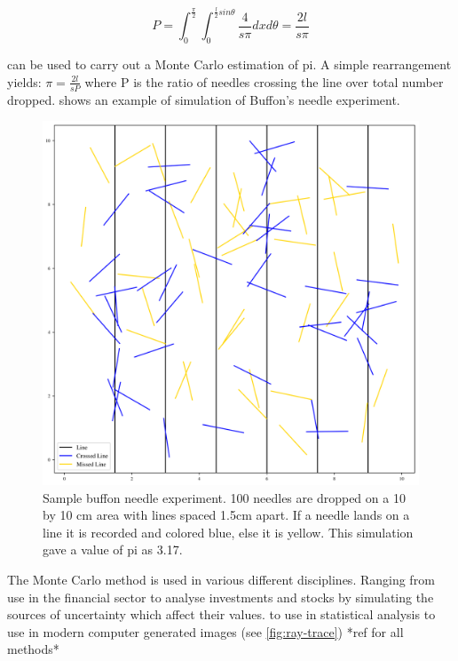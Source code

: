 \begin{equation}
P=\int_0^{\frac{\pi}{2}}\int_0^{\frac{l}{2}sin\theta}\frac{4}{s\pi}dx d\theta = \frac{2 l}{s \pi}\label{eqn:buffon}
\end{equation}


 can be used to carry out a Monte Carlo estimation of pi. A simple rearrangement yields: $\pi = \tfrac{2l}{sP}$ where P is the ratio of needles crossing the line over total number dropped.  shows an example of simulation of Buffon's needle experiment.

\begin{figure}
\centering
\includegraphics[width=\columnwidth/2]{./MCRT/images/buffon-pi=317.pdf}
\caption{Sample buffon needle experiment. 100 needles are dropped on a 10 by 10 cm area with lines spaced 1.5cm apart. If a needle lands on a line it is recorded and colored blue, else it is yellow. This simulation gave a value of pi as 3.17.}
\label{fig:buffon-needle}
\end{figure}

The Monte Carlo method is used in various different disciplines. Ranging from use in the financial sector to analyse investments and stocks by simulating the sources of uncertainty which affect their values. to use in statistical analysis to use in modern computer generated images (see \cref{fig:ray-trace}) *ref for all methods*

